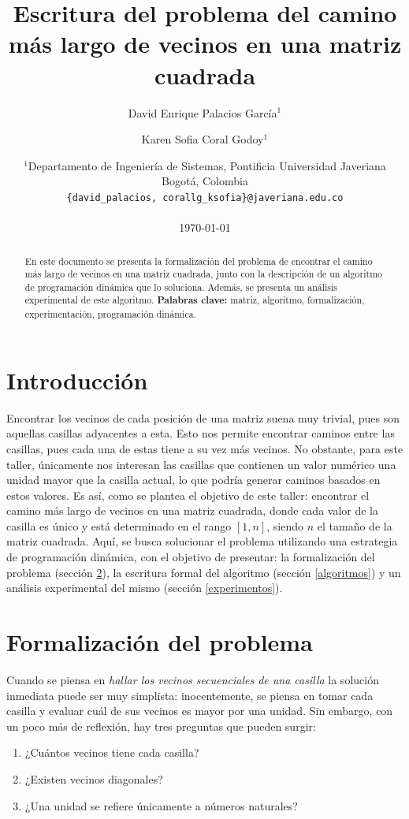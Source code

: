 \documentclass[letter]{article}
\title{Escritura del problema del camino más largo de vecinos en una matriz cuadrada}
\author{David Enrique Palacios García$^1$ \and Karen Sofia Coral Godoy$^1$}
\date{
	$^1$Departamento de Ingeniería de Sistemas, Pontificia Universidad Javeriana\\Bogotá,  Colombia \\
	\texttt{\{david\_palacios, corallg\_ksofia\}@javeriana.edu.co}\\~\\
	\today
}
\begin{document}
\maketitle
	
\begin{abstract}
En este documento se presenta la formalización del problema de encontrar el camino más largo de vecinos en una matriz cuadrada, junto con la descripción de un algoritmo de programación dinámica que lo soluciona. Además, se presenta un análisis experimental de este algoritmo.
\textbf{Palabras clave:} matriz, algoritmo, formalización, experimentación, programación dinámica.
\end{abstract}

\tableofcontents

	
\section{Introducción} \label{intro}
Encontrar los vecinos de cada posición de una matriz suena muy trivial, pues son aquellas casillas adyacentes a esta. Esto nos permite encontrar caminos entre las casillas, pues cada una de estas tiene a su vez más vecinos. No obstante, para este taller, únicamente nos interesan las casillas que contienen un valor numérico una unidad mayor que la casilla actual, lo que podría generar caminos basados en estos valores. Es así, como se plantea el objetivo de este taller: encontrar el camino más largo de vecinos en una matriz cuadrada, donde cada valor de la casilla es único y está determinado en el rango $[1,n]$, siendo $n$ el tamaño de la matriz cuadrada. Aquí, se busca solucionar el problema utilizando una estrategia de programación dinámica, con el objetivo de presentar: la formalización del problema (sección \ref{formalizacion}), la escritura formal del algoritmo (sección \ref{algoritmos}) y un análisis experimental del mismo (sección \ref{experimentos}).

\section{Formalización del problema} \label{formalizacion}
Cuando se piensa en {\it hallar los vecinos secuenciales de una casilla} la solución inmediata puede ser muy simplista: inocentemente, se piensa en tomar cada casilla y evaluar cuál de sus vecinos es mayor por una unidad. Sin embargo, con un poco más de reflexión, hay tres preguntas que pueden surgir:
\begin{enumerate}
  \item ¿Cuántos vecinos tiene cada casilla?
  \item ¿Existen vecinos diagonales?
  \item ¿Una unidad se refiere únicamente a números naturales?
\end{enumerate}
\end{document}
